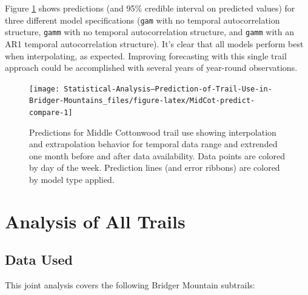 \documentclass[
]{book}
\begin{document}
Figure \ref{fig:MidCot-predict-compare} shows predictions (and 95\% credible interval on predicted values) for three different model specifications (\texttt{gam} with no temporal autocorrelation structure, \texttt{gamm} with no temporal autocorrelation structure, and \texttt{gamm} with an AR1 temporal autocorrelation structure). It's clear that all models perform best when interpolating, as expected. Improving forecasting with this single trail approach could be accomplished with several years of year-round observations.

\begin{figure}

{\centering \texttt{[image: Statistical-Analysis--Prediction-of-Trail-Use-in-Bridger-Mountains\_files/figure-latex/MidCot-predict-compare-1]} 

}

\caption{Predictions for Middle Cottonwood trail use showing interpolation and extrapolation behavior for temporal data range and extrended one month before and after data availability. Data points are colored by day of the week. Prediction lines (and error ribbons) are colored by model type applied.}\label{fig:MidCot-predict-compare}
\end{figure}

\hypertarget{AllTrailsAnalysis}{%
\chapter{Analysis of All Trails}\label{AllTrailsAnalysis}}

\hypertarget{data-used-1}{%
\section{Data Used}\label{data-used-1}}

This joint analysis covers the following Bridger Mountain subtrails:
\end{document}
